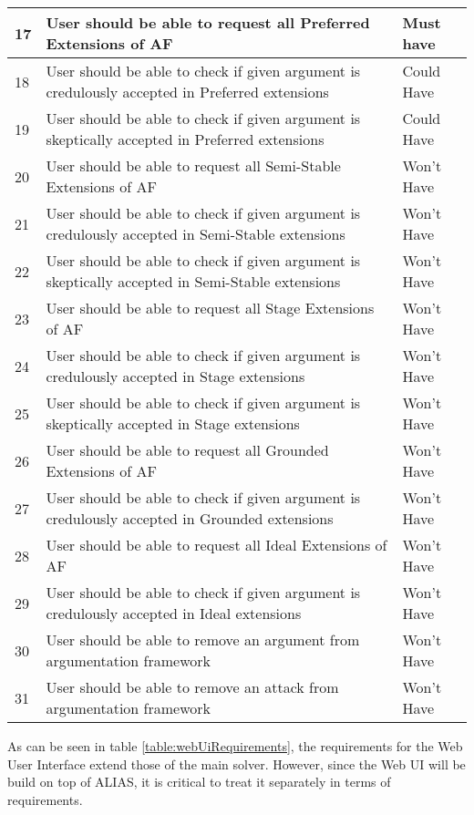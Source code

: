\begin{longtable}[c]{|p{0.5cm}|p{10cm}|p{2.5cm}|}
	17 & User should be able to request all Preferred Extensions of AF & Must have \\ \hline
	18 & User should be able to check if given argument is credulously accepted in Preferred extensions & Could Have \\ \hline
	19 & User should be able to check if given argument is skeptically accepted in Preferred extensions & Could Have \\ \hline
	20 & User should be able to request all Semi-Stable Extensions of AF & Won't Have \\ \hline
	21 & User should be able to check if given argument is credulously accepted in Semi-Stable extensions & Won't Have \\ \hline
	22 & User should be able to check if given argument is skeptically accepted in Semi-Stable extensions & Won't Have \\ \hline
	23 & User should be able to request all Stage Extensions of AF & Won't Have \\ \hline
	24 & User should be able to check if given argument is credulously accepted in Stage extensions & Won't Have \\ \hline
	25 & User should be able to check if given argument is skeptically accepted in Stage extensions & Won't Have \\ \hline
	26 & User should be able to request all Grounded Extensions of AF & Won't Have \\ \hline
	27 & User should be able to check if given argument is credulously accepted in Grounded extensions & Won't Have \\ \hline
	28 & User should be able to request all Ideal Extensions of AF & Won't Have \\ \hline
	29 & User should be able to check if given argument is credulously accepted in Ideal extensions & Won't Have \\ \hline	
	30 & User should be able to remove an argument from argumentation framework & Won't Have \\ \hline
	31 & User should be able to remove an attack from argumentation framework & Won't Have \\ \hline
\end{longtable}

As can be seen in table \ref{table:webUiRequirements}, the requirements for the Web User Interface extend those of the main solver. However, since the Web UI will be build on top of ALIAS, it is critical to treat it separately in terms of requirements. 

